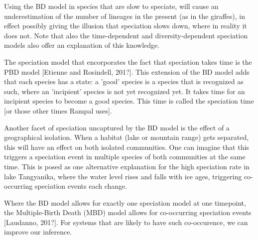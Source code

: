 %
%
%

Using the BD model in species that are slow to speciate, will cause
an underestimation of the number of lineages in the present (as in the
giraffes), in effect possibly giving the illusion that speciation 
slows down, where in reality it does not. Note that also the
time-dependent and diversity-dependent speciation models also
offer an explanation of this knowledge.

%
%
%
%
%

The speciation model that encorporates the fact that speciation takes
time is the PBD model [Etienne and Rosindell, 201?]. This extension of the
BD model adds that each species has a state: a 'good' species is
a species that is recognized as such, where an 'incipient' species is
not yet recognized yet. It takes time for an incipient species to
become a good species. This time is called the speciation time [or those
other times Rampal uses].

%
%
%

Another facet of speciation uncaptured by the BD model is the
effect of a geographical isolation. When a habitat (lake or mountain range)
gets separated, this will have an effect on both isolated communities.
One can imagine that this triggers a speciation event in multiple species
of both communities at the same time. This is posed as one alternative
explanation for the high speciation rate in lake Tangyanika, where the water 
level rises and falls with ice ages, triggering co-occurring speciation
events each change. 

%
%
%

Where the BD model allows for exactly one speciation model at one timepoint,
the Multiple-Birth Death (MBD) model allows for co-occurring 
speciation events [Laudanno, 201?]. For systems that are likely
to have such co-occurence, we can improve our inference.





